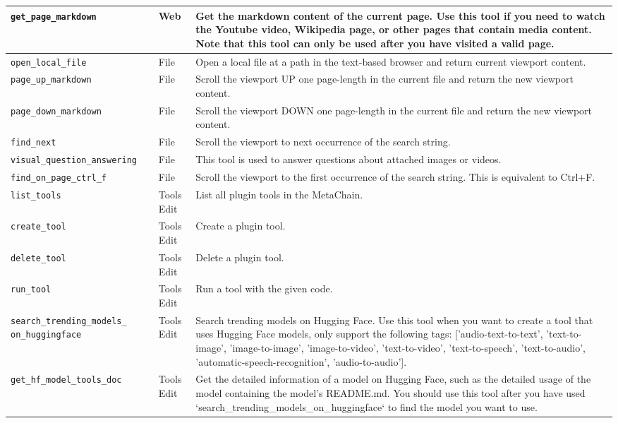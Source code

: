 \begin{longtable}{p{4.8cm}|p{1.5cm}|p{6.5cm}}
 \midrule
\texttt{get\_page\_markdown} & Web & Get the markdown content of the current page. Use this tool if you need to watch the Youtube video, Wikipedia page, or other pages that contain media content. Note that this tool can only be used after you have visited a valid page. \\
\midrule
\texttt{open\_local\_file} & File & Open a local file at a path in the text-based browser and return current viewport content. \\
\midrule
\texttt{page\_up\_markdown} & File & Scroll the viewport UP one page-length in the current file and return the new viewport content. \\
\midrule
\texttt{page\_down\_markdown} & File & Scroll the viewport DOWN one page-length in the current file and return the new viewport content. \\
\midrule
\texttt{find\_next} & File & Scroll the viewport to next occurrence of the search string. \\
\midrule
\texttt{visual\_question\_answering} & File & This tool is used to answer questions about attached images or videos. \\
\midrule
\texttt{find\_on\_page\_ctrl\_f} & File & Scroll the viewport to the first occurrence of the search string. This is equivalent to Ctrl+F. \\
\midrule
\texttt{list\_tools} & Tools Edit & List all plugin tools in the MetaChain. \\
\midrule
\texttt{create\_tool} & Tools Edit & Create a plugin tool. \\
\midrule
\texttt{delete\_tool} & Tools Edit & Delete a plugin tool. \\
\midrule
\texttt{run\_tool} & Tools Edit & Run a tool with the given code. \\
\midrule
\texttt{search\_trending\_models\_} \texttt{on\_huggingface} & Tools Edit & Search trending models on Hugging Face. Use this tool when you want to create a tool that uses Hugging Face models, only support the following tags: ['audio-text-to-text', 'text-to-image', 'image-to-image', 'image-to-video', 'text-to-video', 'text-to-speech', 'text-to-audio', 'automatic-speech-recognition', 'audio-to-audio']. \\
\midrule
\texttt{get\_hf\_model\_tools\_doc} & Tools Edit & Get the detailed information of a model on Hugging Face, such as the detailed usage of the model containing the model's README.md. You should use this tool after you have used `search\_trending\_models\_on\_huggingface` to find the model you want to use. \\

\end{longtable}
